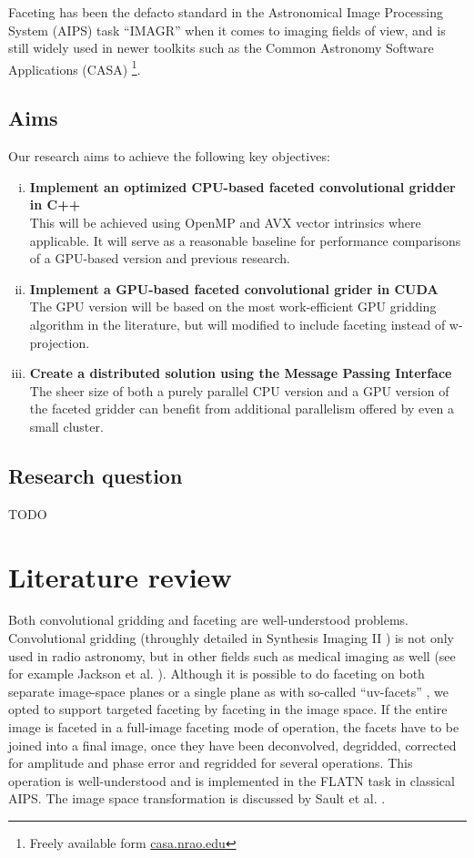 \documentclass[a4paper, two column]{article}
\begin{document}
Faceting has been the defacto standard in the Astronomical Image Processing System (AIPS) task ``IMAGR'' \cite{AIPS113} when it comes to imaging fields of view, and is still 
widely used in newer toolkits such as the Common Astronomy Software Applications (CASA) \footnote{Freely available form \url{casa.nrao.edu}}. 
\subsection{Aims}
Our research aims to achieve the following key objectives:
\begin{enumerate}[i)]
 \item \textbf{Implement an optimized CPU-based faceted convolutional gridder in C++}\\
  This will be achieved using OpenMP and AVX vector intrinsics where applicable. It will serve as a reasonable baseline for performance comparisons of a GPU-based version and previous research.
 \item \textbf{Implement a GPU-based faceted convolutional grider in CUDA}\\
  The GPU version will be based on the most work-efficient GPU gridding algorithm in the literature, but will modified to include faceting instead of w-projection.
 \item \textbf{Create a distributed solution using the Message Passing Interface}\\
  The sheer size of both a purely parallel CPU version and a GPU version of the faceted gridder can benefit from additional parallelism offered by even a small cluster.
\end{enumerate}
\subsection{Research question}
 {\color{red}TODO}
\section{Literature review}
 Both convolutional gridding and faceting are well-understood problems. Convolutional gridding (throughly detailed in Synthesis Imaging II \cite{taylor1999synthesis}) is not only used in radio astronomy, but in other fields such as 
 medical imaging as well (see for example Jackson et al. \cite{jackson1991selection}). Although it is possible to do faceting on both separate image-space planes \cite{cornwell1992radio} or a single plane as with so-called ``uv-facets'' \cite{AIPS113}, we opted to support targeted 
 faceting by faceting in the image space. If the entire image is faceted in a full-image faceting mode of operation, the facets have to be joined into a final image, once they have been deconvolved, degridded, corrected for amplitude and phase error and regridded for several operations. 
 This operation is well-understood and is implemented in the FLATN task in classical AIPS. The image space transformation is discussed by Sault et al. \cite{sault1996approach}.
 
\end{document}
